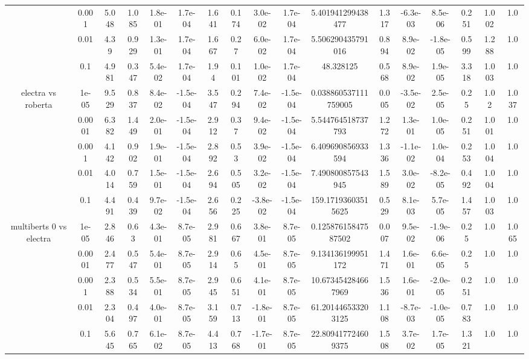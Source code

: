 \begin{tabular}{|c|c|c|c|c|c|c|c|c|c|c|c|c|c|c|c|c|}
 & 0.001 & 5.048 & 1.085 & 1.8e-01 & 1.7e-04 & 1.641 & 0.174 & 3.0e-02 & 1.7e-04 & 5.401941299438477 & 1.317 & -6.3e-03 & 8.5e-06 & 0.251 & 1.002 & 1.0 \\
 & 0.01 & 4.39 & 0.929 & 1.3e-01 & 1.7e-04 & 1.667 & 0.27 & 6.0e-02 & 1.7e-04 & 5.506290435791016 & 0.894 & 8.9e-02 & -1.8e-05 & 0.599 & 1.288 & 1.0 \\
 & 0.1 & 4.981 & 0.347 & 5.4e-02 & 1.7e-04 & 1.94 & 0.101 & 1.0e-02 & 1.7e-04 & 48.328125 & 0.568 & 8.9e-02 & 1.9e-05 & 3.318 & 1.003 & 1.0 \\
\hline
\multirow{5}{*}{electra  vs roberta } & 1e-05 & 9.529 & 0.837 & 8.4e-02 & -1.5e-04 & 3.547 & 0.294 & 7.4e-02 & -1.5e-04 & 0.038860537111759005 & 0.005 & -3.5e-02 & 2.5e-05 & 0.25 & 1.02 & 1.037 \\
 & 0.0001 & 6.382 & 1.449 & 2.0e-01 & -1.5e-04 & 2.912 & 0.37 & 9.4e-02 & -1.5e-04 & 5.544764518737793 & 1.272 & 1.3e-01 & 1.0e-05 & 0.251 & 1.001 & 1.0 \\
 & 0.001 & 4.142 & 0.902 & 1.9e-01 & -1.5e-04 & 2.892 & 0.53 & 3.9e-02 & -1.5e-04 & 6.409690856933594 & 1.336 & -1.1e-02 & 1.0e-04 & 0.253 & 1.004 & 1.0 \\
 & 0.01 & 4.014 & 0.759 & 1.5e-01 & -1.5e-04 & 2.694 & 0.505 & 3.2e-02 & -1.5e-04 & 7.490800857543945 & 1.589 & 3.0e-02 & -8.2e-05 & 0.492 & 1.004 & 1.0 \\
 & 0.1 & 4.491 & 0.439 & 9.7e-02 & -1.5e-04 & 2.656 & 0.225 & -3.8e-02 & -1.5e-04 & 159.17193603515625 & 0.529 & 8.1e-03 & 5.7e-05 & 1.457 & 1.003 & 1.0 \\
\hline
\multirow{5}{*}{multiberts 0 vs electra } & 1e-05 & 2.846 & 0.63 & 4.3e-01 & 8.7e-05 & 2.981 & 0.667 & 3.8e-01 & 8.7e-05 & 0.12587615847587502 & 0.007 & 9.5e-02 & -1.9e-06 & 0.25 & 1.0 & 1.065 \\
 & 0.0001 & 2.477 & 0.547 & 5.4e-01 & 8.7e-05 & 2.914 & 0.65 & 4.5e-01 & 8.7e-05 & 9.134136199951172 & 1.471 & 1.6e-01 & 6.6e-05 & 0.25 & 1.0 & 1.0 \\
 & 0.001 & 2.388 & 0.534 & 5.5e-01 & 8.7e-05 & 2.945 & 0.651 & 4.1e-01 & 8.7e-05 & 10.673454284667969 & 1.536 & 1.6e-01 & -2.0e-05 & 0.251 & 1.0 & 1.0 \\
 & 0.01 & 2.304 & 0.497 & 4.0e-01 & 8.7e-05 & 3.159 & 0.713 & -1.8e-01 & 8.7e-05 & 61.201446533203125 & 1.108 & -8.7e-03 & -1.0e-05 & 0.783 & 1.0 & 1.0 \\
 & 0.1 & 5.645 & 0.765 & 6.1e-02 & 8.7e-05 & 4.413 & 0.768 & -1.7e-01 & 8.7e-05 & 22.809417724609375 & 1.508 & 3.7e-02 & 1.7e-05 & 1.321 & 1.0 & 1.0 \\

\end{tabular}
